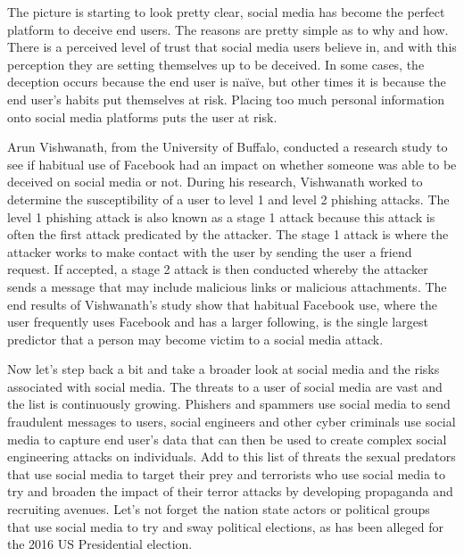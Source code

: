 \documentclass[conference]{IEEEtran}
\begin{document}
The picture is starting to look pretty clear, social media has become the perfect platform to deceive end users.  The reasons are pretty simple as to why and how. There is a perceived level of trust that social media users believe in, and with this perception they are setting themselves up to be deceived. In some cases, the deception occurs because the end user is naïve, but other times it is because the end user’s habits put themselves at risk. Placing too much personal information onto social media platforms puts the user at risk. 

Arun Vishwanath, from the University of Buffalo, conducted a research study to see if habitual use of Facebook had an impact on whether someone was able to be deceived on social media or not. During his research, Vishwanath worked to determine the susceptibility of a user to level 1 and level 2 phishing attacks. The level 1 phishing attack is also known as a stage 1 attack because this attack is often the first attack predicated by the attacker. The stage 1 attack is where the attacker works to make contact with the user by sending the user a friend request.  If accepted, a stage 2 attack is then conducted whereby the attacker sends a message that may include malicious links or malicious attachments\cite{doi:10.1111/jcc4.12100}.   The end results of Vishwanath’s study show that habitual Facebook use, where the user frequently uses Facebook and has a larger following, is the single largest predictor that a person may become victim to a social media attack\cite{doi:10.1111/jcc4.12100}.

Now let's step back a bit and take a broader look at social media and the risks associated with social media.  The threats to a user of social media are vast and the list is continuously growing. Phishers and spammers use social media to send fraudulent messages to users, social engineers and other cyber criminals use social media to capture end user's data that can then be used to create complex social engineering attacks on individuals\cite{ghari_shaabi_2012}. Add to this list of threats the sexual predators that use social media to target their prey and terrorists who use social media to try and broaden the impact of their terror attacks by developing propaganda and recruiting avenues\cite{ghari_shaabi_2012}. Let's not forget the nation state actors or political groups that use social media to try and sway political elections, as has been alleged for the 2016 US Presidential election\cite{ghari_shaabi_2012}. 
\end{document}
